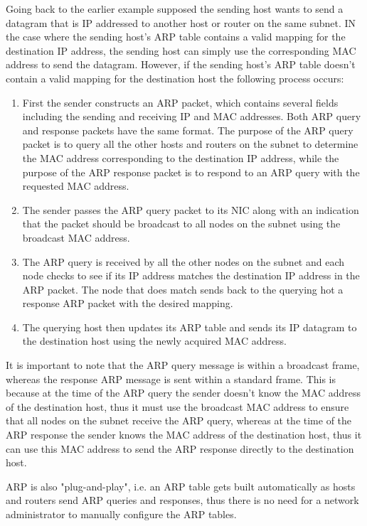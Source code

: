 \documentclass[12pt letter]{report}
\begin{document}
Going back to the earlier example supposed the sending host wants to
send a datagram that is IP addressed to another host or router on the
same subnet. IN the case where the sending host's ARP table contains
a valid mapping for the destination IP address, the sending host can
simply use the corresponding MAC address to send the datagram.
However, if the sending host's ARP table doesn't contain a valid
mapping for the destination host the following process occurs:
\begin{enumerate}
  \item First the sender constructs an ARP packet, which contains
    several fields including the sending and receiving IP and MAC
    addresses. Both ARP query and response packets have the same
    format. The purpose of the ARP query packet is to query all the
    other hosts and routers on the subnet to determine the MAC
    address corresponding to the destination IP address, while the
    purpose of the ARP response packet is to respond to an ARP query
    with the requested MAC address.
  \item The sender passes the ARP query packet to its NIC along with
    an indication that the packet should be broadcast to all nodes on
    the subnet using the broadcast MAC address.
  \item The ARP query is received by all the other nodes on the
    subnet and each node checks to see if its IP address matches the
    destination IP address in the ARP packet. The node that does
    match sends back to the querying hot a response ARP packet with
    the desired mapping.
  \item The querying host then updates its ARP table and sends its IP
    datagram to the destination host using the newly acquired MAC address.
\end{enumerate}

It is important to note that the ARP query message is within a
broadcast frame, whereas the response ARP message is sent within a
standard frame. This is because at the time of the ARP query the
sender doesn't know the MAC address of the destination host, thus it
must use the broadcast MAC address to ensure that all nodes on the
subnet receive the ARP query, whereas at the time of the ARP response
the sender knows the MAC address of the destination host, thus it can
use this MAC address to send the ARP response directly to the destination host.

ARP is also "plug-and-play", i.e. an ARP table gets built
automatically as hosts and routers send ARP queries and responses,
thus there is no need for a network administrator to manually
configure the ARP tables.
\end{document}

